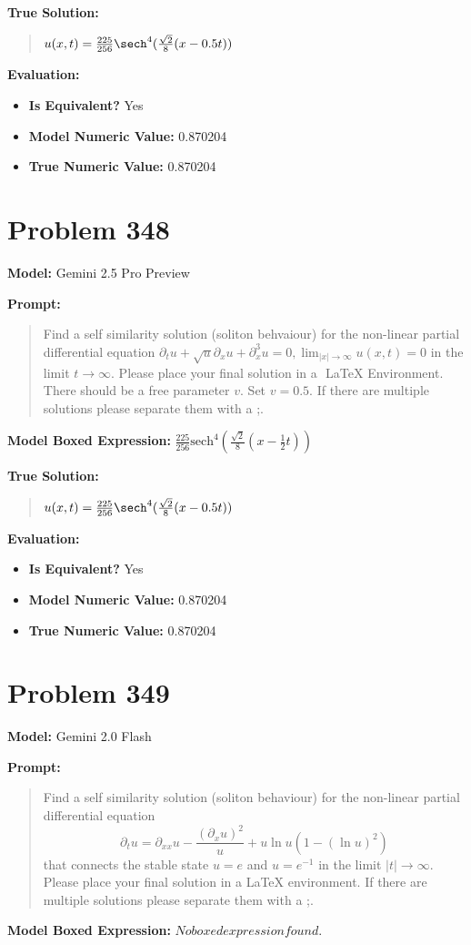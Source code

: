 \documentclass{article}
\begin{document}
{\textbf{True Solution:}
\begin{quote}
$u(x,t) = \frac{225}{256} \sech^4( \frac{\sqrt{2}}{8} (x - 0.5t) )$
\end{quote}

\textbf{Evaluation:}
\begin{itemize}
\item \textbf{Is Equivalent?} Yes
\item \textbf{Model Numeric Value:} 0.870204
\item \textbf{True Numeric Value:} 0.870204
\end{itemize}
\vspace{1cm}
\section*{Problem 348}
\textbf{Model:} Gemini 2.5 Pro Preview

\textbf{Prompt:}
\begin{quote}
Find a self similarity solution (soliton behvaiour) for the non-linear partial differential equation $\partial_t u +\sqrt{u}\partial_x u + \partial_x^3 u=0, \lim_{|x|\to\infty} u(x,t)=0$ in the limit $t\rightarrow\infty$. Please place your final solution in a $\boxed{}$ LaTeX Environment. There should be a free parameter $v$. Set $v=0.5$. If there are multiple solutions please separate them with a ;.
\end{quote}
\textbf{Model Boxed Expression:} $\frac{225}{256} \text{sech}^4\left(\frac{\sqrt{2}}{8}\left(x - \frac{1}{2}t\right)\right)$

\textbf{True Solution:}
\begin{quote}
$u(x,t) = \frac{225}{256} \sech^4( \frac{\sqrt{2}}{8} (x - 0.5t) )$
\end{quote}

\textbf{Evaluation:}
\begin{itemize}
\item \textbf{Is Equivalent?} Yes
\item \textbf{Model Numeric Value:} 0.870204
\item \textbf{True Numeric Value:} 0.870204
\end{itemize}
\vspace{1cm}
\section*{Problem 349}
\textbf{Model:} Gemini 2.0 Flash

\textbf{Prompt:}
\begin{quote}
Find a self similarity solution (soliton behaviour) for the non-linear partial differential equation $$ \partial_t u = \partial_{xx} u - \frac{(\partial_x u)^2}{u} + u \ln u \left(1 - (\ln u)^2\right) $$ that connects the stable state $u = e$ and $u = e^{-1}$ in the limit $|t| \rightarrow \infty$. Please place your final solution in a \boxed{} LaTeX environment. If there are multiple solutions please separate them with a ;.
\end{quote}
\textbf{Model Boxed Expression:} $No boxed expression found.$

}
\end{document}
